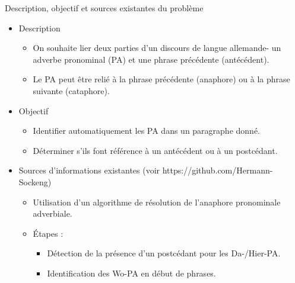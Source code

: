 \documentclass{beamer}
\begin{document}
\begin{frame}{Description, objectif et sources existantes du problème}
	\begin{itemize}
		\item Description
	
	\begin{itemize}
		\item On souhaite lier deux parties d'un discours de langue allemande- un adverbe pronominal (PA) et une phrase précédente (antécédent).
		\item Le PA peut être relié à la phrase précédente (anaphore) ou à la phrase suivante (cataphore).
	\end{itemize}


\item Objectif
	\begin{itemize}
		\item Identifier automatiquement les PA dans un paragraphe donné.
		\item Déterminer s'ils font référence à un antécédent ou à un postcédant.
	\end{itemize}

\item  Sources d'informations existantes (voir https://github.com/Hermann-Sockeng)
\begin{itemize}
    \item Utilisation d'un algorithme de résolution de l'anaphore pronominale adverbiale.
\item Étapes :
\begin{itemize}
	\item Détection de la présence d'un postcédant pour les Da-/Hier-PA.
	\item Identification des Wo-PA en début de phrases.
\end{itemize}
\end{itemize}
\end{itemize}
\end{frame}
\end{document}
